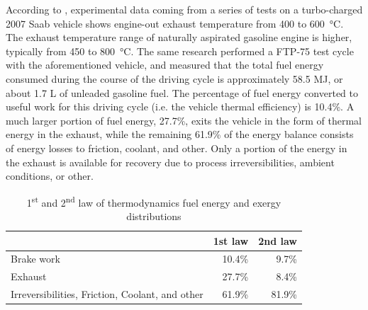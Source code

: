 According to \cite{Conklin2010}, experimental data coming from a series of tests on a turbo-charged 2007 Saab vehicle shows engine-out exhaust temperature from 400 to \SI{600}{\celsius}. The exhaust temperature range of naturally aspirated gasoline engine is higher, typically from 450 to \SI{800}{\celsius}. The same research performed a FTP-75 test cycle with the aforementioned vehicle, and measured that the total fuel energy consumed during the course of the driving cycle is approximately 58.5 MJ, or about 1.7 L of unleaded gasoline fuel. The percentage of fuel energy converted to useful work for this driving cycle (i.e. the vehicle thermal efficiency) is 10.4\%. A much larger portion of fuel energy, 27.7\%, exits the vehicle in the form of thermal energy in the exhaust, while the remaining 61.9\% of the energy balance consists of energy losses to friction, coolant, and other. Only a portion of the energy in the exhaust is available for recovery due to process irreversibilities, ambient conditions, or other.

\begin{table}
  \begin{center}
    \begin{tabular}{lrr}
      & 1st law & 2nd law \\
      \hline
      Brake work & 10.4\% & 9.7\% \\
      Exhaust & 27.7\% & 8.4\% \\
      Irreversibilities, Friction, Coolant, and other & 61.9\% & 81.9\% \\
    \end{tabular}
    \caption{1\textsuperscript{st} and 2\textsuperscript{nd} law of thermodynamics fuel energy and exergy distributions}
    \label{table:1st_2nd_law}
  \end{center}
\end{table}

